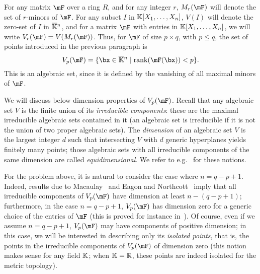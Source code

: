 \documentclass[12pt]{article}
\begin{document}
For any matrix $\mF$ over a ring $R$, and for any integer $r$,
$M_r(\mF)$ will denote the set of $r$-minors of $\mF$. For any subset $I$ in
$\mathbb{K}[X_1,\dots,X_n]$, $V(I)$ will denote the zero-set of $I$ in
$\overline{\mathbb{K}}{}^n$, and for a matrix $\mF$ with entries in
$\mathbb{K}[X_1,\dots,X_n]$, we will write $V_r(\mF)=V(M_r(\mF))$. Thus, for
$\mF$ of size $p \times q$, with $p \le q$, the set of points
introduced in the previous paragraph is
$$\VpF{p}{\mF}=\{\bx \in \KKbar{}^n \mid \mathrm{rank}(\mF({\bx})) < p\}.$$
This is an algebraic set, since it is defined by the vanishing of
all maximal minors of $\mF$. 

We will discuss below dimension properties of $\VpF{p}{\mF}$.  Recall
that any algebraic set $V$ is the finite union of its
\emph{irreducible components}: these are the maximal irreducible
algebraic sets contained in it (an algebraic set is irreducible if it
is not the union of two proper algebraic sets). The {\em dimension} of
an algebraic set $V$ is the largest integer $d$ such that intersecting
$V$ with $d$ generic hyperplanes yields finitely many points; those
algebraic sets with all irreducible components of the same dimension
are called {\em equidimensional}. We refer to
e.g.~\cite[Chap.\ I and II]{Shafarevich77} for these notions.

For the problem above, it is natural to consider the case where $n =
q-p+1$.  Indeed, results due to Macaulay~\cite{Macaulay16} and Eagon
and Northcott~\cite{EN62} imply that all irreducible components of
$\VpF{p}{\mF}$ have dimension at least $n-(q-p+1)$; furthermore, in
the case $n = q-p+1$, $\VpF{p}{\mF}$ has dimension zero for a generic
choice of the entries of $\mF$ (this is proved for instance
in~\cite{Spa14}). Of course, even if we assume $n = q-p+1$,
$\VpF{p}{\mF}$ may have components of positive
dimension; in this case, we will be interested in describing only its
{\em isolated points}, that is, the points in the irreducible
components of $\VpF{p}{\mF}$ of dimension zero (this notion makes
sense for any field $\mathbb{K}$; when $\mathbb{K}=\mathbb{R}$, these points are
indeed isolated for the metric topology).
\end{document}
